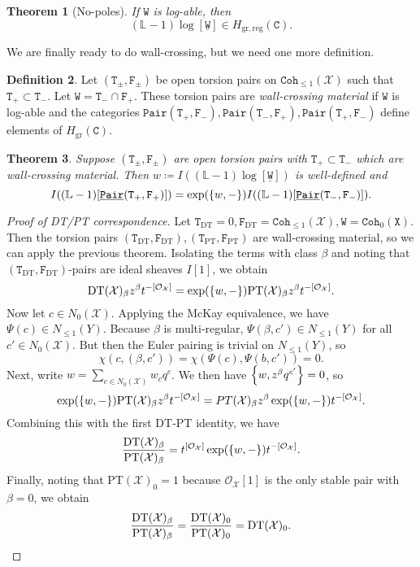 \documentclass{amsart}
\newtheorem{thm}{Theorem}[section]
\theoremstyle{definition}
\newtheorem{defn}[thm]{Definition}
\theoremstyle{remark}
\theoremstyle{plain}
\theoremstyle{definition}
\theoremstyle{remark}
\renewcommand{\L}{\mathbb{L}}
\newcommand{\mc}[1]{\mathcal{#1}}
\newcommand{\mr}[1]{\mathrm{#1}}
\newcommand{\mt}[1]{\mathtt{#1}}
\newcommand{\ul}[1]{\underline{#1}}
\newcommand{\1}{\mathbf{1}}
\newcommand{\2}{\mathbf{2}}
\newcommand{\3}{\mathbf{3}}
\begin{document}
\begin{thm}[No-poles]
    If $\mt{W}$ is log-able, then
    \[ (\L - 1) \log [\mt{\ul{W}}] \in H_{\mr{gr,reg}}(\mt{C}). \]
\end{thm}

We are finally ready to do wall-crossing, but we need one more definition.

\begin{defn}
    Let $(\mt{T}_{\pm}, \mt{F}_{\pm})$ be open torsion pairs on $\mt{Coh}_{\leq 1}(\mc{X})$ such that $\mt{T}_+ \subset \mt{T}_-$. Let $\mt{W} = \mt{T}_- \cap \mt{F}_+$. These torsion pairs are \textit{wall-crossing material} if $\mt{W}$ is log-able and the categories $\mt{Pair(T_+, F_-)}, \mt{Pair(T_-, F_+)}, \mt{Pair(T_+,F_-)}$ define elements of $H_{\mr{gr}}(\mt{C})$.
\end{defn}

\begin{thm}
    Suppose $(\mt{T_{\pm}}, \mt{F_{\pm}})$ are open torsion pairs with $\mt{T_+} \subset \mt{T_-}$ which are wall-crossing material. Then $w \coloneqq I((\L-1) \log [\mt{\ul{W}}])$ is well-defined and
    \[ I((\L-1)[\mt{\ul{Pair}(T_+,F_+)}]) = \exp(\qty{w,-}) I((\L-1) [\mt{\ul{Pair}(T_-, F_-)}]). \]
\end{thm}

\begin{proof}[Proof of DT/PT correspondence]
    Let $\mt{T}_{\mr{DT}} = 0, \mt{F}_{\mr{DT}} = \mt{Coh}_{\leq 1}(\mc{X}), \mt{W} = \mt{Coh}_0(\mt{X})$. Then the torsion pairs $(\mt{T}_{\mr{DT}}, \mt{F}_{\mr{DT}}), (\mt{T}_{\mr{PT}}, \mt{F}_{\mr{PT}})$ are wall-crossing material, so we can apply the previous theorem. Isolating the terms with class $\beta$ and noting that $(\mt{T}_{\mr{DT}}, \mt{F}_{\mr{DT}})$-pairs are ideal sheaves $I[1]$, we obtain
    \[ \mr{DT}(\mc{X})_{\beta}z^{\beta} t^{-[\mc{O}_{\mc{X}}]} = \exp(\qty{w,-}) \mr{PT}(\mc{X})_{\beta} z^{\beta} t^{-[\mc{O}_{\mc{X}}]}. \]
    Now let $c \in N_0(\mc{X})$. Applying the McKay equivalence, we have $\Psi(c) \in N_{\leq 1}(Y)$. Because $\beta$ is multi-regular, $\Psi(\beta, c') \in N_{\leq 1}(Y)$ for all $c' \in N_0(\mc{X})$. But then the Euler pairing is trivial on $N_{\leq 1}(Y)$, so 
    \[ \chi(c, (\beta, c')) = \chi(\Psi(c), \Psi(b, c')) = 0. \]
    Next, write $w = \sum_{c \in N_0(\mc{X})} w_c q^c$. We then have $\qty{w, z^{\beta}q^{c'}} = 0$, so
    \[ \exp(\qty{w, -}) \mr{PT}(\mc{X})_{\beta} z^{\beta} t^{-[\mc{O}_{\mc{X}}]} = PT(\mc{X})_{\beta} z^{\beta} \exp(\qty{w,-}) t^{-[\mc{O}_{\mc{X}}]}. \]
    Combining this with the first DT-PT identity, we have 
    \[ \frac{\mr{DT}(\mc{X})_{\beta}}{\mr{PT}(\mc{X})_{\beta}} = t^{[\mc{O}_{\mc{X}}]} \exp(\qty{w,-}) t^{-[\mc{O}_{\mc{X}}]}. \]
    Finally, noting that $\mr{PT}(\mc{X})_0 = 1$ because $\mc{O}_{\mc{X}}[1]$ is the only stable pair with $\beta = 0$, we obtain
    \[ \frac{\mr{DT}(\mc{X})_{\beta}}{\mr{PT}(\mc{X})_{\beta}} = \frac{\mr{DT}(\mc{X})_{0}}{\mr{PT}(\mc{X})_{0}} = \mr{DT}(\mc{X})_{0}. \qedhere \]
\end{proof}
\end{document}
